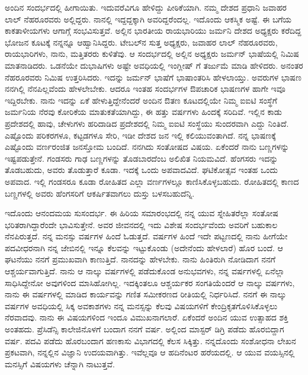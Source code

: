 ಅಂದಿನ ಸಂದರ್ಭದಲ್ಲಿ ಹೀಗಾಯಿತು. ಇದುವರೆವಿಗೂ ಹೇಳಿದ್ದು ಪೀಠಿಕೆಯಾಗಿ. ನಮ್ಮ ದೇಶದ ಪ್ರಧಾನಿ ಜವಾಹರ ಲಾಲ್ ನೆಹರೂರವರು ಅಲ್ಲಿದ್ದರು. ನಾನಲ್ಲಿ ಇದ್ದದ್ದಕ್ಕಾಗಿ ಅವರಿದ್ದರೆಂದಲ್ಲ. ಇದೊಂದು ಆಕಸ್ಮಿಕ ಅಷ್ಟೆ. ಈ ಬಗೆಯ ಕಾಕತಾಳೀಯಗಳು ಆಗಾಗ್ಗೆ ಸಂಭವಿಸುತ್ತವೆ. ಅಲ್ಲಿನ ಭಾರತೀಯ ರಾಯಭಾರಿಯು ಜರ್ಮನಿ ದೇಶದ ಅಧ್ಯಕ್ಷರು ಕರೆದಿದ್ದ ಭೋಜನ ಕೂಟಕ್ಕೆ ನನ್ನನ್ನೂ ಆಹ್ವಾನಿಸಿದ್ದರು. ಟೇಬಲ್‍ನ ಸುತ್ತ ಅಧ್ಯಕ್ಷರು, ಜವಾಹರ ಲಾಲ್ ನೆಹರೂರವರು, ರಾಯಭಾರಿಗಳು, ನಾನು, ಮತ್ತಿತರರು ಕುಳಿತೆವು. ಆ ಸಂದರ್ಭದಲ್ಲಿ ಅಲ್ಲಿನ ಅಧ್ಯಕ್ಷರು ಜರ್ಮನ್ ಭಾಷೆಯಲ್ಲಿ  ನಿಮಿಷ ಮಾತನಾಡಿದರು. ಒಡನೆಯೇ ದುಭಾಷಿಗಳು ಅಷ್ಟೇ ಅವಧಿಯಲ್ಲಿ ಇಂಗ್ಲೀಷ್ ಗೆ ತರ್ಜುಮೆ ಮಾಡಿ ಹೇಳಿದರು. ಅನಂತರ ನೆಹರೂರವರು  ನಿಮಿಷ ಉತ್ತರಿಸಿದರು. ಇದನ್ನು ಜರ್ಮನ್ ಭಾಷೆಗೆ ಭಾಷಾಂತರಿಸಿ ಹೇಳಲಾಯ್ತು. ಅವರುಗಳ ಭಾಷಣ ನನಗಿಲ್ಲಿ ನೆನಪಿಲ್ಲವೆಂದು ಹೇಳಲೇಬೇಕು. ಆದರೂ ಇಂತಹ ಸಂದರ್ಭಗಳ ಔಪಚಾರಿಕ ಭಾಷಣಗಳ ಹಾಗೇ ಇವೂ ಇದ್ದಿರಬೇಕು. ನಾನು ಇದನ್ನು ಏಕೆ ಹೇಳುತ್ತಿದ್ದೇನೆಂದರೆ ಅಂದಿನ ಔತಣ ಕೂಟದಲ್ಲಿಯೇ ನಿಮ್ಮ ಐಐಟಿ ಸಂಸ್ಥೆಗೆ ಜರ್ಮನಿಯ ನೆರವು ಕೋರಿಕೆಯ ಮಾತುಕತೆಯಾಗಿದ್ದು, ಈ ಹತ್ತು ವರ್ಷಗಳು ಹಿಂದಕ್ಕೆ ಸರಿದಿವೆ. ಇಲ್ಲಿನ ಕಾಡು ಪ್ರದೇಶದಲ್ಲಿ ಹಾವು, ಚೇಳುಗಳು ಹರಿದಾಡಿದ ಪ್ರದೇಶದಲ್ಲಿ ನಿಮ್ಮ ಐಐಟಿ ಸಂಸ್ಥೆಯು ಸುಂದರವಾಗಿ ಎದ್ದು ನಿಂತಿದೆ. ಎಷ್ಟೊಂದು ಪರಿಕರಗಳೂ, ಕಟ್ಟಡಗಳೂ ಸೇರಿ, ಇಡೀ ದೇಶದ ಜನ ಇಲ್ಲಿ ಕಲಿಯುವಂತಾಗಿದೆ. ನನ್ನ ಭಾಷಣಕ್ಕೆ ಎಷ್ಟೊಂದು ವರ್ಣರಂಜಿತ ಜನಸ್ತೋಮ ಬಂದಿದೆ. ನನಗಿದು ಸಂತೋಷದ ವಿಷಯ. ಏಕೆಂದರೆ ನಾನು ಬಣ್ಣಗಳನ್ನು ಇಷ್ಟಪಡುತ್ತೇನೆ. ಗಂಡಸರು ಗಾಢ ಬಣ್ಣಗಳನ್ನು ತೊಡಬಾರದೆಂಬ ಅಲಿಖಿತ ನಿಯಮವಿದೆ. ಹೆಂಗಸರು ಇದನ್ನು ತೊಡಬಹುದು, ಅವರು ತೊಡುತ್ತಾರೆ ಕೂಡಾ. ಇದಕ್ಕೆ ಒಂದು ಅಪವಾದವಿದೆ. ಘಟಿಕೋತ್ಸವ ಇಂತಹ ಒಂದು ಅಪವಾದ. ಇಲ್ಲಿ ಗಂಡಸರೂ ಕೂಡಾ ರೋಹಿತದ ಎಲ್ಲಾ ವರ್ಣಗಳಲ್ಲೂ ಕಾಣಿಸಿಕೊಳ್ಳಬಹುದು. ರೋಹಿತದಲ್ಲಿ ಕಾಣದ ಬಣ್ಣಗಳಲ್ಲಿ ಅವರು ಹೆಂಗಸರಿಗೆ ಆಕರ್ಷಿತವಾಗಲು ದುಸ್ತು ಬಳಸಬಹುದೆನ್ನಿ.



ಇದೊಂದು ಆನಂದಮಯ ಸುಸಂದರ್ಭ. ಈ ಹಿರಿಯ ಸಮಾರಂಭದಲ್ಲಿ ನನ್ನ ಯುವ ಸ್ನೇಹಿತರೆಲ್ಲಾ ಸಂತೋಷ ಭರಿತರಾಗಿದ್ದಾರೆಂದೇ ಭಾವಿಸುತ್ತೇನೆ. ಅವರ ಜೀವನದಲ್ಲಿ ಇದು ವಿಶೇಷ ಸಂದರ್ಭವೆಂದು ಅವರಿಗೆ ಬಹುಕಾಲ ನೆನಪಿರುತ್ತದೆ. ನನ್ನ ಮನಸ್ಸು  ವರ್ಷಗಳ ಹಿಂದೆ ಓಡುತ್ತದೆ.  ವರ್ಷಗಳ ಹಿಂದೆ ಇದೇ ಪಟ್ಟಣದಲ್ಲಿ ನಾನು ಹೀಗೆಯೇ ಪದವೀಧರನಾಗಿ ನನ್ನ ಜೇಬಿನಲ್ಲಿ ಇನ್ನೂ ಕೆಲವನ್ನು ಇಟ್ಟುಕೊಂಡು (ಅದೇನೆಂದು ಹೇಳಲಾರೆ) ಹೊರ ಬಂದೆ. ಆ ಘಟನೆಯು ನನಗೆ ಪ್ರಮುಖವಾಗಿ ಕಾಣುತ್ತಿದೆ. ನಾನದನ್ನು ಹೇಳಬೇಕು. ನಾನು ಹಿಂತಿರುಗಿ ನೋಡಿದಾಗ ನನಗೆ ಆಶ್ಚರ್ಯವಾಗುತ್ತಿದೆ. ನಾನು ಆ ನಾಲ್ಕು ವರ್ಷಗಳಲ್ಲಿ ಪಡೆದುಕೊಂಡ ಅನುಭವಗಳು, ನನ್ನ  ವರ್ಷಗಳಲ್ಲಿ ಏನೆಲ್ಲಾ ಸಾಧಿಸಿದ್ದೇನೋ ಅವುಗಳಿಂದ ಮಾಸಿಹೋಗಿಲ್ಲ. ಇದಕ್ಕಿಂತಲೂ ಆಶ್ಚರ್ಯಕರ ಸಂಗತಿಯೆಂದರೆ ಆ ನಾಲ್ಕು ವರ್ಷಗಳು, ನಾನು ಈ  ವರ್ಷಗಳಲ್ಲಿ ಮಾಡಿದ ಕಾರ್ಯವನ್ನು ಗಣಿತ ಸಮೀಕರಣದ ರೀತಿಯಲ್ಲಿ ನಿರ್ಧರಿಸಿದೆ. ನನಗೆ ಈ ನಾಲ್ಕು ವರ್ಷಗಳ ಅವಧಿಯಲ್ಲಿ ಸಿಕ್ಕ ಅವಕಾಶಗಳು ನನ್ನ ಮನಸ್ಸನ್ನು ಕೆಲವು ವಿಷಯಗಳಿಗೆ ಕೇಂದ್ರಿಕೃತಗೊಳಿಸಿಕೊಳ್ಳಲು ನೆರವಾದವು. ನಾನು ಈ ವಿಷಯಗಳಿಂದ ಇಂದೂ ವಿಮುಖನಾಗಲಾರೆ. ಏಕೆಂದರೆ ಅಂದಿನ ಯುವ ಉತ್ಸಾಹದ ಶಕ್ತಿ ಅಂತಹದು. ಪ್ರೆಸಿಡೆನ್ಸಿ ಕಾಲೇಜಿನೊಳಗೆ ಬಂದಾಗ ನನಗೆ  ವರ್ಷ. ಅಲ್ಲಿಂದ ಮಾಸ್ಟರ್ ಡಿಗ್ರಿ ಪಡೆದು ಹೊರಬಿದ್ದಾಗ  ವರ್ಷ. ಪದವಿ ಪಡೆದು ಹೊರಬಂದಾಗ ಹಣಕಾಸು ವಿಭಾಗದಲ್ಲಿ ಕೆಲಸ ಸಿಕ್ಕಿತ್ತು. ನನ್ನದೊಂದು ಸಂಶೋಧನಾ ಲೇಖನ ಪ್ರಕಟವಾಗಿ, ನನ್ನಲ್ಲಿನ ವಿಜ್ಞಾನಿ ಉದಯವಾಗಿತ್ತು. ಇವೆಲ್ಲವೂ ಆ ಹದಿನೆಂಟರ ಹರೆಯದಲ್ಲಿ. ಆ ಯುವ ವಯಸ್ಸಿನಲ್ಲಿ ಮನಸ್ಸಿಗೆ ವಿಷಯಗಳು ಚೆನ್ನಾಗಿ ನಾಟುತ್ತವೆ.

